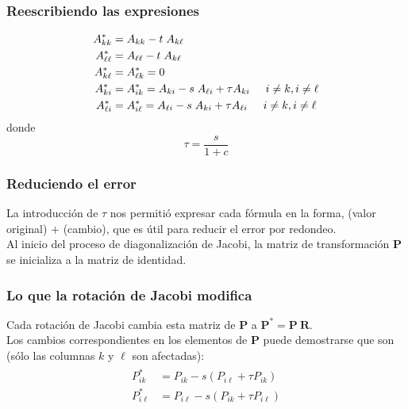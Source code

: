 \documentclass[12pt]{beamer}
\begin{document}
\begin{frame}
\frametitle{Reescribiendo las expresiones}
\begin{align}
\begin{aligned}
A_{k k}^{*} &= A_{k k} - t \; A_{k \ell} \\
A_{\ell \ell}^{*} &= A_{\ell \ell} - t \; A_{k \ell} \\
A_{k \ell}^{*} &= A_{\ell k}^{*} = 0 \\
A_{k i}^{*} &= A_{i k}^{*} = A_{k i} - s \; A_{\ell i} + \tau A_{k i} \hspace{0.5cm} i \neq k, i \neq \ell \\
A_{\ell i}^{*} &= A_{i \ell}^{*} = A_{\ell i} - s \; A_{k i} + \tau A_{\ell i} \hspace{0.5cm} i \neq k, i \neq \ell \\
\end{aligned}
\label{eq:ecuacion_09_18}
\end{align}
\fontsize{14}{14}\selectfont
donde
\fontsize{12}{12}\selectfont
\begin{equation}
\tau = \dfrac{s}{1 + c}
\label{eq:ecuacion_09_19}
\end{equation}
\end{frame}
\begin{frame}
\frametitle{Reduciendo el error}
La introducción de $\tau$ nos permitió expresar cada fórmula en la forma, (valor original) $+$ (cambio), que es útil para reducir el error por redondeo.
\\
\bigskip
\pause
Al inicio del proceso de diagonalización de Jacobi, la matriz de transformación $\mathbf{P}$ se inicializa a la matriz de identidad.
\end{frame}
\begin{frame}
\frametitle{Lo que la rotación de Jacobi modifica}
Cada rotación de Jacobi cambia esta matriz de $\mathbf{P}$ a $\mathbf{P}^{*} = \mathbf{P \: R}$.
\\
\bigskip
\pause
Los cambios correspondientes en los elementos de $\mathbf{P}$ puede demostrarse que son (sólo las columnas $k$ y $\ell$ son afectadas):
\begin{align}
\begin{aligned}
P_{i k}^{*} &= P_{i k} - s (P_{i \ell} + \tau P_{i k}) \\
P_{i \ell}^{*} &= P_{i \ell} - s (P_{i k} + \tau P_{i \ell})
\end{aligned}
\label{eq:ecuacion_09_20}
\end{align}
\end{frame}
\end{document}

